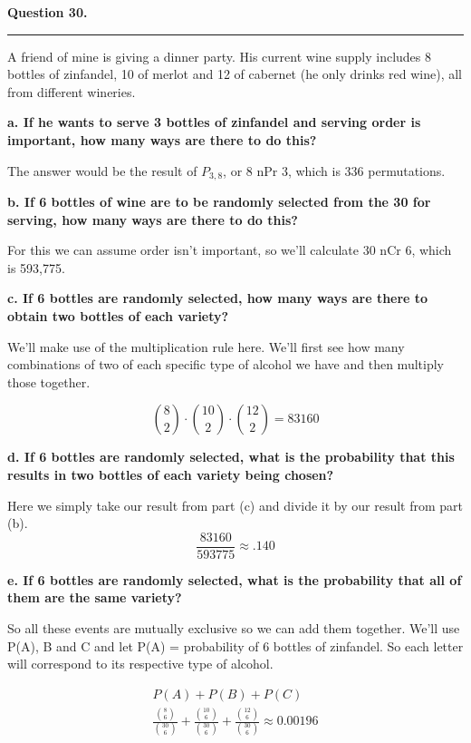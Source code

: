 \textbf{Question 30.} \\
\hrule 

A friend of mine is giving a dinner party. His current wine supply includes 8 bottles of zinfandel, 10 of merlot and 12 of cabernet (he only drinks red wine), all from different wineries. 

\textbf{a. If he wants to serve 3 bottles of zinfandel and serving order is important, how many ways are there to do this?}

The answer would be the result of $P_{3,8}$, or 8 nPr 3, which is 336 permutations.

\textbf{b. If 6 bottles of wine are to be randomly selected from the 30 for serving, how many ways are there to do this?}

For this we can assume order isn't important, so we'll calculate 30 nCr 6, which is 593,775.

\textbf{c. If 6 bottles are randomly selected, how many ways are there to obtain two bottles of each variety?}

We'll make use of the multiplication rule here. We'll first see how many combinations of two of each specific type of alcohol we have and then multiply those together.

\[\binom{8}{2} \cdot \binom{10}{2} \cdot \binom{12}{2} = 83160\]

\textbf{d. If 6 bottles are randomly selected, what is the probability that this results in two bottles of each variety being chosen?}

Here we simply take our result from part (c) and divide it by our result from part (b).
\[\frac{83160}{593775} \approx .140\]

\textbf{e. If 6 bottles are randomly selected, what is the probability that all of them are the same variety?}

So all these events are mutually exclusive so we can add them together. We'll use P(A), B and C and let P(A) = probability of 6 bottles of zinfandel. So each letter will correspond to its respective type of alcohol.

\begin{align*}
    P(A) + P(B) + P(C) \\
    \frac{\binom{8}{6}}{\binom{30}{6}} + \frac{\binom{10}{6}}{\binom{30}{6}} + \frac{\binom{12}{6}}{\binom{30}{6}} \approx 0.00196    
\end{align*}